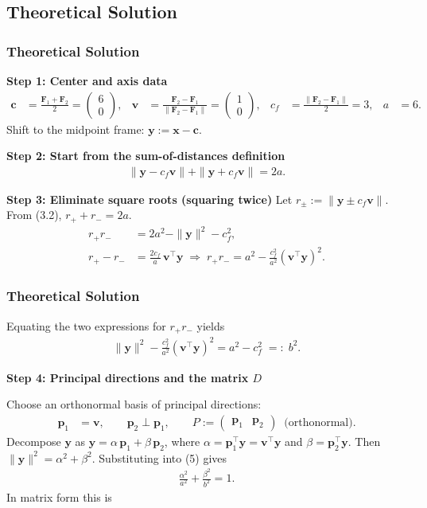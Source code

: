 \documentclass{beamer}
\theoremstyle{remark}
\newcommand{\myvec}[1]{\ensuremath{\begin{pmatrix}#1\end{pmatrix}}}
\let\vec\mathbf
\numberwithin{equation}{section}
\begin{document}
\subsection{Theoretical Solution }
\begin{frame}
\frametitle{Theoretical Solution}
\textbf{Step 1: Center and axis data}
\begin{align}
\vec c &= \frac{\vec F_1+\vec F_2}{2}=\myvec{6\\0}, &
\vec v &= \frac{\vec F_2-\vec F_1}{\|\vec F_2-\vec F_1\|}=\myvec{1\\0}, &
c_f &= \frac{\|\vec F_2-\vec F_1\|}{2}=3, &
a &= 6.
\end{align}
Shift to the midpoint frame: $\vec y:=\vec x-\vec c$.

\textbf{Step 2: Start from the sum-of-distances definition}
\begin{align}
\|\vec y-c_f\vec v\|+\|\vec y+c_f\vec v\|=2a.
\end{align}

\textbf{Step 3: Eliminate square roots (squaring twice)}
Let $r_\pm:=\|\vec y\pm c_f\vec v\|$. From (3.2), $r_++r_-=2a$.
\begin{align}
r_+r_- &= 2a^2-\|\vec y\|^2-c_f^2, \\
r_+-r_- &= \frac{2c_f}{a}\,\vec v^\top\vec y
\;\Rightarrow\;
r_+r_- = a^2-\frac{c_f^2}{a^2}(\vec v^\top\vec y)^2.
\end{align}

\end{frame}

\begin{frame}
\frametitle{Theoretical Solution}
Equating the two expressions for $r_+r_-$ yields
\begin{align}
\|\vec y\|^2-\frac{c_f^2}{a^2}(\vec v^\top\vec y)^2 = a^2-c_f^2 \;=:\; b^2.
\end{align}

\textbf{Step 4: Principal directions and the matrix $D$}

Choose an orthonormal basis of principal directions:
\begin{align}
\vec p_1 &= \vec v, \qquad \vec p_2 \perp \vec p_1, \qquad
P:=\myvec{\vec p_1 & \vec p_2} \;\;\text{(orthonormal)}.
\end{align}
Decompose $\vec y$ as $\vec y = \alpha\,\vec p_1 + \beta\,\vec p_2$, where
$\alpha=\vec p_1^\top\vec y=\vec v^\top\vec y$ and $\beta=\vec p_2^\top\vec y$.
Then $\|\vec y\|^2=\alpha^2+\beta^2$. Substituting into (5) gives
\begin{align}
\frac{\alpha^2}{a^2}+\frac{\beta^2}{b^2}=1.
\end{align}
In matrix form this is

\end{frame}
\end{document}
